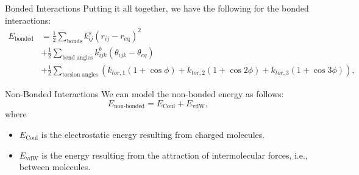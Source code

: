 \documentclass[aspectratio=169]{beamer}
\begin{document}
\begin{frame}[fragile]{Bonded Interactions}
Putting it all together, we have the following for the bonded interactions:
%
\begin{equation}
\begin{split}
	E_{\text{bonded}} &= \frac{1}{2} \sum_{\text{bonds}} k_{ij}^s \left(r_{ij} - r_{\text{eq}}\right)^2 \\
	&+ \frac{1}{2} \sum_{\text{bend angles}} k_{ijk}^{b} \left(\theta_{ijk} - \theta_{eq} \right)\\
	&+ \frac{1}{2} \sum_{\text{torsion angles}} \left( k_{tor,1}(1 + \cos \phi) + k_{tor, 2}(1 + \cos 2\phi) + k_{tor, 3}(1 + \cos 3\phi)\right),
\end{split}
\end{equation}
%

\end{frame}

\begin{frame}[fragile]{Non-Bonded Interactions}
We can model the non-bonded energy as follows:
%
\begin{equation}
	E_{\text{non-bonded}} = E_{\text{Coul}} + E_{\text{vdW}},
\end{equation}
%
where
%
\begin{itemize}
	\item $E_{\text{Coul}}$ is the electrostatic energy resulting from charged molecules.
	\item $E_{\text{vdW}}$ is the energy resulting from the attraction of intermolecular forces, i.e., between molecules.
\end{itemize}
%

\end{frame}
\end{document}
